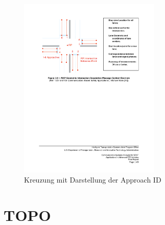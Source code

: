 \begin{figure}[htbp]
	\includegraphics[width=0.60\textwidth]{content/images/04_facilitylayer/spatKreuzung-Anfahrtsstreifen.pdf}
	\caption{Kreuzung mit Darstellung der Approach ID \cite{usSpat}}
	\label{fig:darstellungKreuzung}
\end{figure}




\section{TOPO\label{sec:topo}}

